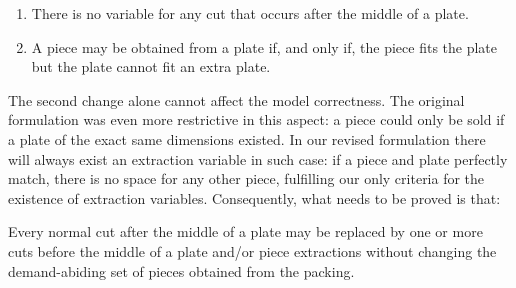 \documentclass[runningheads]{llncs}
\begin{document}
\begin{enumerate}
\item There is no variable for any cut that occurs after the middle of a plate.
\item A piece may be obtained from a plate if, and only if, the piece fits the plate but the plate cannot fit an extra plate.
\end{enumerate}
 
The second change alone cannot affect the model correctness.
The original formulation was even more restrictive in this aspect:
a piece could only be sold if a plate of the exact same dimensions existed.
In our revised formulation there will always exist an extraction variable in such case:
if a piece and plate perfectly match, there is no space for any other piece, fulfilling our only criteria for the existence of extraction variables.
Consequently, what needs to be proved is that:

\begin{theorem}
Every normal cut after the middle of a plate may be replaced by one or more cuts before the middle of a plate and/or piece extractions without changing the demand-abiding set of pieces obtained from the packing.
\end{theorem}
\end{document}
